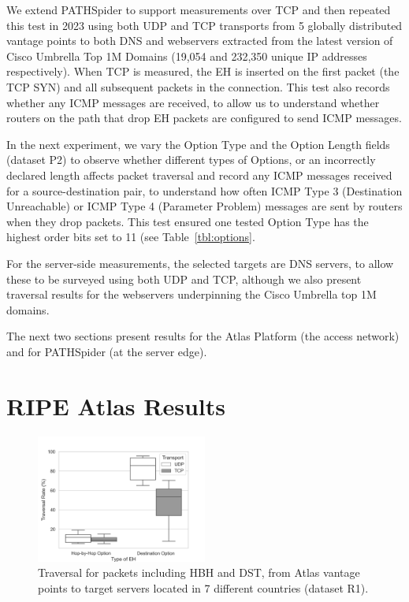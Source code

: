 \documentclass[conference]{IEEEtran}
\begin{document}
We extend PATHSpider to support measurements over TCP and then repeated this test in 2023 using both UDP and TCP transports from 5 globally distributed vantage points to both DNS and webservers extracted from the latest version of Cisco Umbrella Top 1M Domains (19,054 and 232,350 unique IP addresses respectively). When TCP is measured, the EH is inserted on the first packet (the TCP SYN) and all subsequent packets in the connection.
This test also records whether any ICMP messages are received, to allow us to understand whether routers on the path that drop EH packets are configured to send ICMP messages.

In the next experiment, we vary the Option Type and the Option Length fields (dataset P2) to observe whether different types of Options, or an incorrectly declared length affects packet traversal and record any ICMP messages received
for a source-destination pair, to understand how often ICMP Type 3 (Destination Unreachable) or ICMP Type 4 (Parameter Problem) messages are sent by routers when they drop packets. This test ensured one tested Option Type has the highest order bits set to 11 (see Table~\ref{tbl:options}.

For the server-side measurements, the selected targets are DNS servers, to allow these to be surveyed using both UDP and TCP, although we also present traversal results for the webservers underpinning the Cisco Umbrella top 1M domains.

The next two sections present results for the Atlas Platform  (the access network) and for PATHSpider (at the server edge).


\section{RIPE Atlas Results} 
\label{sec:ripe-results}

\begin{figure}[t]
\centering
  \includegraphics[width=0.5\textwidth]{all_traversal.png}
  \caption{Traversal for packets including HBH and DST, from Atlas vantage points to target servers located in 7 different countries (dataset R1).}
  \label{fig:countrybox}
\end{figure}
\end{document}
